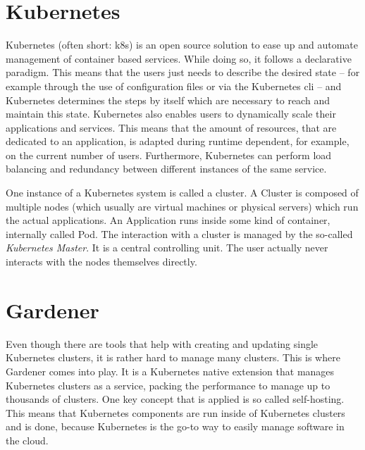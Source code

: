 \section{Kubernetes}
\label{sec:kubernetes}
Kubernetes (often short: k8s) is an open source solution to ease up and automate management of container based services.
While doing so, it follows a declarative paradigm.
This means that the users just needs to describe the desired state -- for example through the use of configuration files or via the Kubernetes \ac{cli} -- and Kubernetes determines the steps by itself which are necessary to reach and maintain this state.
Kubernetes also enables users to dynamically scale their applications and services.
This means that the amount of resources, that are dedicated to an application, is adapted during runtime dependent, for example, on the current number of users.
Furthermore, Kubernetes can perform load balancing and redundancy between different instances of the same service.
\cite{Bloß2019, wasistk8s}

One instance of a Kubernetes system is called a cluster.
A Cluster is composed of multiple nodes (which usually are virtual machines or physical servers) which run the actual applications.
An Application runs inside some kind of container, internally called Pod.
The interaction with a cluster is managed by the so-called \emph{Kubernetes Master}.
It is a central controlling unit.
The user actually never interacts with the nodes themselves directly.
\cite{k8skonzepte}

\section{Gardener}
Even though there are tools that help with creating and updating single Kubernetes clusters, it is rather hard to manage many clusters.
This is where Gardener comes into play.
It is a Kubernetes native extension that manages Kubernetes clusters as a service, packing the performance to manage up to thousands of clusters.
One key concept that is applied is so called self-hosting.
This means that Kubernetes components are run inside of Kubernetes clusters and is done, because Kubernetes is the go-to way to easily manage software in the cloud. \cite{gardener.architecture, gardener.blog1, gardener.blog2, gardener.cloud}

